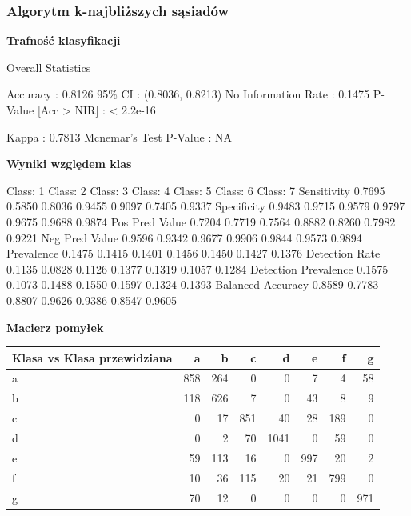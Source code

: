 \documentclass[11pt]{article} %
\begin{document}
\subsubsection{Algorytm k-najbliższych sąsiadów}

\textbf{Trafność klasyfikacji}

Overall Statistics
                                          
               Accuracy : 0.8126          
                 95\% CI : (0.8036, 0.8213)
    No Information Rate : 0.1475          
    P-Value [Acc > NIR] : < 2.2e-16       
                                          
                  Kappa : 0.7813          
 Mcnemar's Test P-Value : NA   

\textbf{Wyniki względem klas}

                    Class: 1 Class: 2 Class: 3 Class: 4 Class: 5 Class: 6 Class: 7
Sensitivity            0.7695   0.5850   0.8036   0.9455   0.9097   0.7405   0.9337
Specificity            0.9483   0.9715   0.9579   0.9797   0.9675   0.9688   0.9874
Pos Pred Value         0.7204   0.7719   0.7564   0.8882   0.8260   0.7982   0.9221
Neg Pred Value         0.9596   0.9342   0.9677   0.9906   0.9844   0.9573   0.9894
Prevalence             0.1475   0.1415   0.1401   0.1456   0.1450   0.1427   0.1376
Detection Rate         0.1135   0.0828   0.1126   0.1377   0.1319   0.1057   0.1284
Detection Prevalence   0.1575   0.1073   0.1488   0.1550   0.1597   0.1324   0.1393
Balanced Accuracy      0.8589   0.7783   0.8807   0.9626   0.9386   0.8547   0.9605

\textbf{Macierz pomyłek}

 \begin{center}
    \begin{tabular}{ | l | r | r | r | r | r | r | r | }
    \hline
 Klasa vs Klasa przewidziana &  a &  b &  c &  d &  e &  f &  g \\ \hline
a &  858 & 264 &   0  &  0 &   7 &   4 &  58 \\
b & 118 & 626 &   7 &   0 &  43 &   8 &   9 \\
c &  0  & 17 &  851 &  40 &  28 & 189   & 0 \\
d &  0   & 2 &  70 & 1041 &   0  & 59 &    0 \\
e &  59  & 113  & 16 &   0 & 997 &  20  &  2 \\
f &  10 &  36 & 115  & 20 &  21  & 799  &  0 \\
g &  70  & 12 &   0 &   0  &  0 &   0 &  971 \\ \hline
    \end{tabular}
\end{center}
\end{document}
